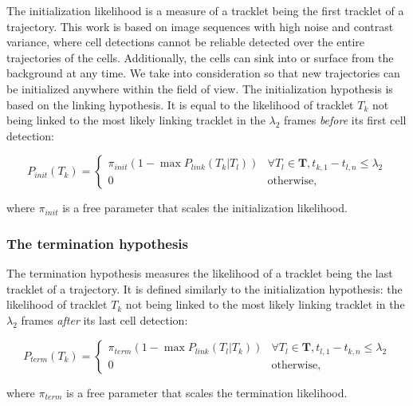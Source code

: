        		The initialization likelihood is a measure of a tracklet being the first tracklet of a trajectory. This work is based on image sequences with high noise and contrast variance, where cell detections cannot be reliable detected over the entire trajectories of the cells. Additionally, the cells can sink into or surface from the background at any time. We take into consideration so that new trajectories can be initialized anywhere within the field of view. The initialization hypothesis is based on the linking hypothesis. It is equal to the likelihood of tracklet $T_k$ not being linked to the most likely linking tracklet in the $\lambda_2$ frames \textit{before} its first cell detection:
       	
       		\[
       			P_{init}(T_k) = \begin{cases}
       				\pi_{init} (1 - \max{P_{link}(T_k | T_l)}) & \forall T_l \in \textbf{T}, t_{k, 1} - t_{l, n} \leq \lambda_2\\
       				0 & \text{otherwise,}
       			\end{cases}
       		\]
       		
       		\noindent where $\pi_{init}$ is a free parameter that scales the initialization likelihood.

       	\subsubsection{The termination hypothesis \statusfirstdraft}
       		The termination hypothesis measures the likelihood of a tracklet being the last tracklet of a trajectory. It is defined similarly to the initialization hypothesis: the likelihood of tracklet $T_k$ not being linked to the most likely linking tracklet in the $\lambda_2$ frames \textit{after} its last cell detection:
       		
       		\[
     		      P_{term}(T_k) = \begin{cases}
     		      	\pi_{term} (1 - \max{P_{link}(T_l | T_k)}) & \forall T_l \in \textbf{T}, t_{l, 1} - t_{k, n} 	\leq \lambda_2\\
     		      	0 & \text{otherwise,}
     		       	\end{cases}
     		\]
       		       		
       		\noindent where $\pi_{term}$ is a free parameter that scales the termination likelihood.

